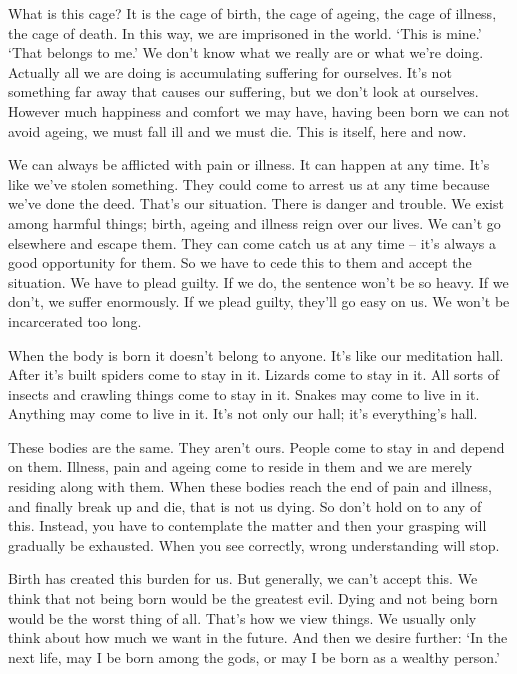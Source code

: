 What is this cage? It is the cage of birth, the cage of ageing, the cage of illness, the cage of death. In this way, we are imprisoned in the world. `This is mine.' `That belongs to me.' We don't know what we really are or what we're doing. Actually all we are doing is accumulating suffering for ourselves. It's not something far away that causes our suffering, but we don't look at ourselves. However much happiness and comfort we may have, having been born we can not avoid ageing, we must fall ill and we must die. This is  itself, here and now.

We can always be afflicted with pain or illness. It can happen at any time. It's like we've stolen something. They could come to arrest us at any time because we've done the deed. That's our situation. There is danger and trouble. We exist among harmful things; birth, ageing and illness reign over our lives. We can't go elsewhere and escape them. They can come catch us at any time -- it's always a good opportunity for them. So we have to cede this to them and accept the situation. We have to plead guilty. If we do, the sentence won't be so heavy. If we don't, we suffer enormously. If we plead guilty, they'll go easy on us. We won't be incarcerated too long.

When the body is born it doesn't belong to anyone. It's like our meditation hall. After it's built spiders come to stay in it. Lizards come to stay in it. All sorts of insects and crawling things come to stay in it. Snakes may come to live in it. Anything may come to live in it. It's not only our hall; it's everything's hall.

These bodies are the same. They aren't ours. People come to stay in and depend on them. Illness, pain and ageing come to reside in them and we are merely residing along with them. When these bodies reach the end of pain and illness, and finally break up and die, that is not us dying. So don't hold on to any of this. Instead, you have to contemplate the matter and then your grasping will gradually be exhausted. When you see correctly, wrong understanding will stop.

Birth has created this burden for us. But generally, we can't accept this. We think that not being born would be the greatest evil. Dying and not being born would be the worst thing of all. That's how we view things. We usually only think about how much we want in the future. And then we desire further: `In the next life, may I be born among the gods, or may I be born as a wealthy person.'

